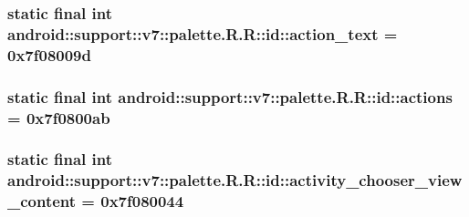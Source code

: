 \hypertarget{classandroid_1_1support_1_1v7_1_1palette_1_1_r_1_1id_8fa2a0b51b626c3d56b14f3e1838c895}{
\subsubsection[{action\_\-text}]{\setlength{\rightskip}{0pt plus 5cm}static final int android::support::v7::palette.R.R::id::action\_\-text = 0x7f08009d}}
\label{classandroid_1_1support_1_1v7_1_1palette_1_1_r_1_1id_8fa2a0b51b626c3d56b14f3e1838c895}


\hypertarget{classandroid_1_1support_1_1v7_1_1palette_1_1_r_1_1id_a9300900f60f2c2b13f303697fe5669f}{
\subsubsection[{actions}]{\setlength{\rightskip}{0pt plus 5cm}static final int android::support::v7::palette.R.R::id::actions = 0x7f0800ab}}
\label{classandroid_1_1support_1_1v7_1_1palette_1_1_r_1_1id_a9300900f60f2c2b13f303697fe5669f}


\hypertarget{classandroid_1_1support_1_1v7_1_1palette_1_1_r_1_1id_4b7af73fe782bdd1d68dfcfb2ec48c30}{
\subsubsection[{activity\_\-chooser\_\-view\_\-content}]{\setlength{\rightskip}{0pt plus 5cm}static final int android::support::v7::palette.R.R::id::activity\_\-chooser\_\-view\_\-content = 0x7f080044}}
\label{classandroid_1_1support_1_1v7_1_1palette_1_1_r_1_1id_4b7af73fe782bdd1d68dfcfb2ec48c30}


